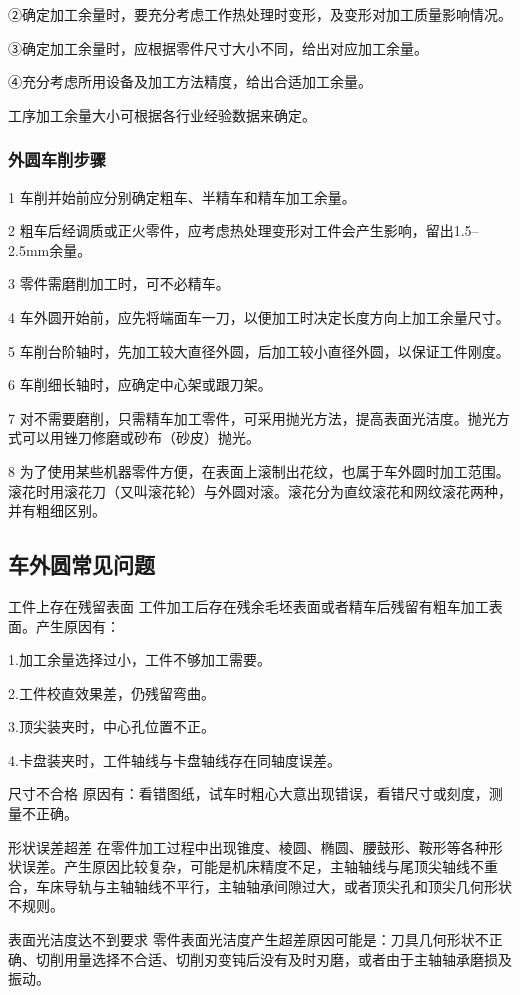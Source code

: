 \documentclass{ctexbook}
\begin{document}
②确定加工余量时，要充分考虑工作热处理时变形，及变形对加工质量影响情况。

③确定加工余量时，应根据零件尺寸大小不同，给出对应加工余量。

④充分考虑所用设备及加工方法精度，给出合适加工余量。

工序加工余量大小可根据各行业经验数据来确定。
\subsubsection{外圆车削步骤}
1 车削并始前应分别确定粗车、半精车和精车加工余量。

2 粗车后经调质或正火零件，应考虑热处理变形对工件会产生影响，留出1.5--2.5mm余量。

3 零件需磨削加工时，可不必精车。

4 车外圆开始前，应先将端面车一刀，以便加工时决定长度方向上加工余量尺寸。

5 车削台阶轴时，先加工较大直径外圆，后加工较小直径外圆，以保证工件刚度。

6 车削细长轴时，应确定中心架或跟刀架。

7 对不需要磨削，只需精车加工零件，可采用抛光方法，提高表面光洁度。抛光方式可以用锉刀修磨或砂布（砂皮）抛光。

8 为了使用某些机器零件方便，在表面上滚制出花纹，也属于车外圆时加工范围。滚花时用滚花刀（又叫滚花轮）与外圆对滚。滚花分为直纹滚花和网纹滚花两种，并有粗细区别。
\subsection{车外圆常见问题}
工件上存在残留表面 工件加工后存在残余毛坯表面或者精车后残留有粗车加工表面。产生原因有：

1.加工余量选择过小，工件不够加工需要。

2.工件校直效果差，仍残留弯曲。

3.顶尖装夹时，中心孔位置不正。

4.卡盘装夹时，工件轴线与卡盘轴线存在同轴度误差。

尺寸不合格 原因有：看错图纸，试车时粗心大意出现错误，看错尺寸或刻度，测量不正确。

形状误差超差 在零件加工过程中出现锥度、棱圆、椭圆、腰鼓形、鞍形等各种形状误差。产生原因比较复杂，可能是机床精度不足，主轴轴线与尾顶尖轴线不重合，车床导轨与主轴轴线不平行，主轴轴承间隙过大，或者顶尖孔和顶尖几何形状不规则。

表面光洁度达不到要求 零件表面光洁度产生超差原因可能是：刀具几何形状不正确、切削用量选择不合适、切削刃变钝后没有及时刃磨，或者由于主轴轴承磨损及振动。
\end{document}
